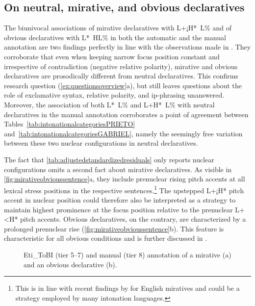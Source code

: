 \subsection{On neutral, mirative, and obvious declaratives}
\label{ch:6.3.1}

The biunivocal associations of mirative declaratives with L+¡H*~L\% and of obvious declaratives with L*~HL\% in both the automatic and the manual annotation are two findings perfectly in line with the observations made in . They corroborate that even when keeping narrow focus position constant and irrespective of contradiction (negative relative polarity), mirative and obvious declaratives are prosodically different from neutral declaratives. This confirms research question (\ref{ex:questionsoverview}a), but still leaves questions about the role of exclamative syntax, relative polarity, and ip-phrasing unanswered. Moreover, the association of both L*~L\% and L+H*~L\% with neutral declaratives in the manual annotation corroborates a point of agreement between Tables~\ref{tab:intonationalcategoriesPRIETO} and~\ref{tab:intonationalcategoriesGABRIEL}, namely the seemingly free variation between these two nuclear configurations in neutral declaratives. 

The fact that \autoref{tab:adjustedstandardizedresiduals} only reports nuclear configurations omits a second fact about mirative declaratives. As visible in \autoref{fig:mirativeobvioussentence}a, they include prenuclear rising pitch accents at all lexical stress positions in the respective sentences.\footnote{This is in line with recent findings by \citet{RettSturman.2020} for English miratives and could be a strategy employed by many intonation languages.} The upstepped L+¡H* pitch accent in nuclear position could therefore also be interpreted as a strategy to maintain highest prominence at the focus position relative to the prenuclear L+<H* pitch accents. Obvious declaratives, on the contrary, are characterized by a prolonged prenuclear rise (\autoref{fig:mirativeobvioussentence}b). This feature is characteristic for all obvious conditions and is further discussed in .

\begin{sidewaysfigure}
	\centering
	\hspace{2em}%
	\caption[Eti\_ToBI (tier 5--7) and manual (tier 8) annotation of a mirative (a) and an obvious declarative (b)]{Eti\_ToBI (tier 5--7) and manual (tier 8) annotation of a mirative (a) and an obvious declarative (b).}\label{fig:mirativeobvioussentence}
\end{sidewaysfigure}

